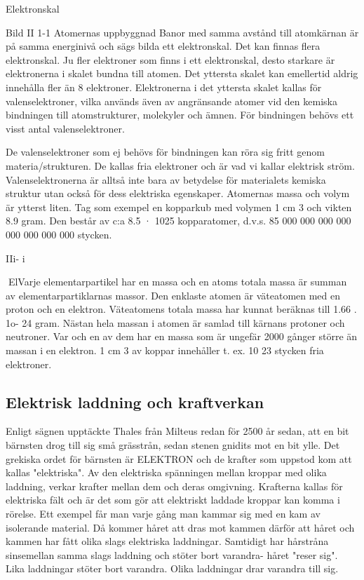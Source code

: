 Elektronskal

Bild II 1-1 Atomernas uppbyggnad
Banor med samma avstånd till atomkärnan är på samma energinivå och sägs bilda
ett elektronskal.
Det kan finnas flera elektronskal. Ju fler
elektroner som finns i ett elektronskal, desto
starkare är elektronerna i skalet bundna till
atomen. Det yttersta skalet kan emellertid
aldrig innehålla fler än 8 elektroner.
Elektronerna i det yttersta skalet kallas
för valenselektroner, vilka används även av
angränsande atomer vid den kemiska bindningen till atomstrukturer, molekyler och
ämnen. För bindningen behövs ett visst
antal valenselektroner.

De valenselektroner som ej behövs för
bindningen kan röra sig fritt genom materia/strukturen. De kallas fria elektroner och är vad vi kallar elektrisk ström.
Valenselektronerna är alltså inte bara av
betydelse för materialets kemiska struktur
utan också för dess elektriska egenskaper.
Atomernas massa och volym är ytterst
liten. Tag som exempel en kopparkub med
volymen 1 cm 3 och vikten 8.9 gram. Den
består av c:a 8.5 · 1025 kopparatomer, d.v.s.
85 000 000 000 000 000 000 000 000
stycken.

IIi- i

ElVarje elementarpartikel har en massa och
en atoms totala massa är summan av
elementarpartiklarnas massor. Den enklaste
atomen är väteatomen med en proton och
en elektron. Väteatomens totala massa har
kunnat beräknas till 1.66 . 1o- 24 gram.
Nästan hela massan i atomen är samlad
till kärnans protoner och neutroner. Var och
en av dem har en massa som är ungefär
2000 gånger större än massan i en elektron.
1 cm 3 av koppar innehåller t. ex. 10 23 stycken
fria elektroner.

\subsection{Elektrisk laddning och kraftverkan}

Enligt sägnen upptäckte Thales från Milteus
redan för 2500 år sedan, att en bit bärnsten
drog till sig små grässtrån, sedan stenen
gnidits mot en bit ylle. Det grekiska ordet för
bärnsten är ELEKTRON och de krafter som
uppstod kom att kallas "elektriska". Av den
elektriska spänningen mellan kroppar med
olika laddning, verkar krafter mellan dem
och deras omgivning. Krafterna kallas för
elektriska fält och är det som gör att elektriskt
laddade kroppar kan komma i rörelse.
Ett exempel får man varje gång man
kammar sig med en kam av isolerande material. Då kommer håret att dras mot kammen därför att håret och kammen har fått
olika slags elektriska laddningar. Samtidigt
har hårstråna sinsemellan samma slags laddning och stöter bort varandra- håret "reser
sig".
Lika laddningar stöter bort varandra.
Olika laddningar drar varandra till sig.

